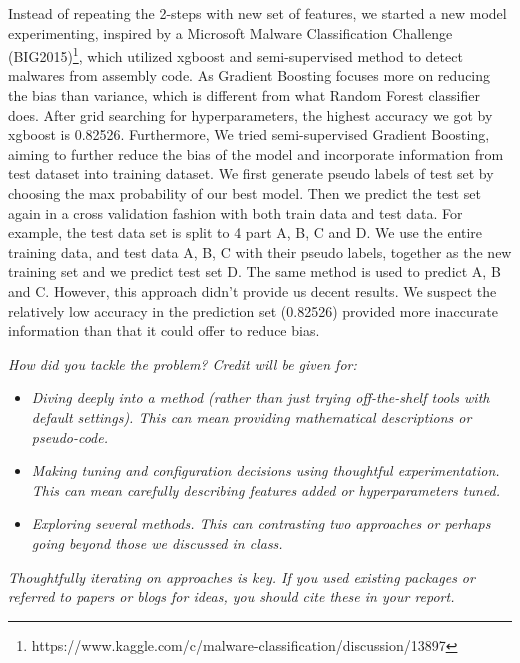 \documentclass[11pt]{article}
\begin{document}
\begin{enumerate}
Instead of repeating the 2-steps with new set of features, we started a new model experimenting, inspired by a Microsoft Malware Classification Challenge (BIG2015)\footnote{https://www.kaggle.com/c/malware-classification/discussion/13897}, which utilized xgboost and semi-supervised method to detect malwares from assembly code. As Gradient Boosting focuses more on reducing the bias than variance, which is different from what Random Forest classifier does. After grid searching for hyperparameters, the highest accuracy we got by xgboost is 0.82526. Furthermore, We tried semi-supervised Gradient Boosting, aiming to further reduce the bias of the model and incorporate information from test dataset into training dataset. We first generate pseudo labels of test set by choosing the max probability of our best model. Then we predict the test set again in a cross validation fashion with both train data and test data.
For example, the test data set is split to 4 part A, B, C and D. We use the entire training data, and test data A, B, C with their pseudo labels, together as the new training set and we predict test set D. The same method is used to predict A, B and C. However, this approach didn't provide us decent results. We suspect the relatively low accuracy in the prediction set (0.82526) provided more inaccurate information than that it could offer to reduce bias. 
\end{enumerate}

\textit{How did you tackle the problem? Credit will be given for:}

  \begin{itemize}
  \item \textit{Diving deeply into a method (rather than just trying
    off-the-shelf tools with default settings). This can mean 
    providing mathematical descriptions or pseudo-code.}
  \item \textit{Making tuning and configuration decisions using thoughtful experimentation.  
    This can mean carefully describing features added or hyperparameters tuned.}
  \item \textit{Exploring several methods. This can contrasting two approaches
    or perhaps going beyond those we discussed in class.}
  \end{itemize}

  \noindent \textit{Thoughtfully iterating on approaches is key.
  If you used existing packages or referred to papers or blogs for ideas,
  you should cite these in your report. }
\end{document}
